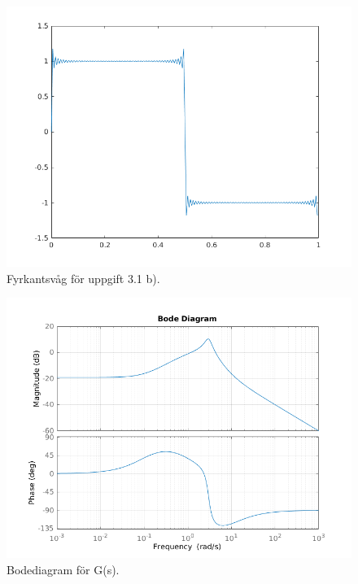 \begin{figure}
    \label{fig:task1b}
    \caption{Fyrkantsvåg för uppgift 3.1 b).}
    \centering
    \includegraphics[scale=0.75]{figures/task1b.png}
\end{figure}

\begin{figure}
    \label{fig:task2a-bode}
    \caption{Bodediagram för G(s).}
    \centering
    \includegraphics[scale=0.8]{figures/task2a-bode.png}
\end{figure}

